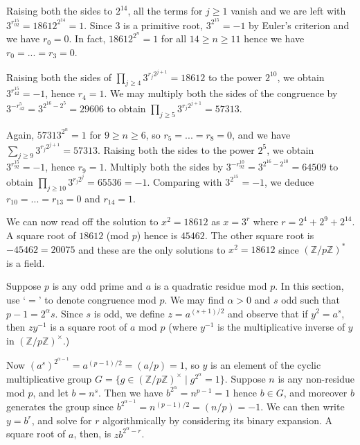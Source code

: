 \documentclass[12pt]{article}
\begin{document}
Raising both the sides to \(2^{14}\), all the terms for \(j\geq 1\) vanish and
we are left with \(3^{r_02^{15}}= 18612^{2^{14}} = 1\). Since \(3\) is a
primitive root, \(3^{2^{15}} = -1\) by Euler's criterion and we have \(r_0=0\).
In fact, \(18612^{2^n}=1\) for all \(14\geq n\geq 11\) hence we have \(r_0=...=r_3 =
0\). 

Raising both the sides of \(\prod_{j\geq 4}3^{r_j2^{j+1}}=18612\) to the power
\(2^{10}\), we obtain \(3^{r_42^{15}}=-1\), hence \(r_4 = 1\). We may multiply
both the sides of the congruence by \(3^{-r_42^5} = 3^{2^{16}-2^5} = 29606\) to
obtain \(\prod_{j\geq 5}3^{r_j2^{j+1}}=57313.\) 

Again, \(57313^{2^n}=1\) for \(9\geq n \geq 6\), so \(r_5=...=r_8=0\), and we
have \(\sum_{j\geq 9}3^{r_j2^{j+1}} = 57313\). Raising both the sides to the
power \(2^5\), we obtain \(3^{r_92^{15}}=-1\), hence \(r_9 = 1\). Multiply both
the sides by \(3^{-r_92^{10}} = 3^{2^{16}-2^{10}} = 64509\) to obtain
\(\prod_{j\geq 10}3^{r_j2^j} = 65536 = -1\). Comparing with \(3^{2^{15}} = -1\),
we deduce \(r_{10} = ... = r_{13}=0\) and \(r_{14}=1\).

We can now read off the solution to \(x^2 = 18612\) as \(x= 3^r\) where
\(r=2^4+2^9+2^{14}\). A square root of \(18612\) (mod \(p\)) hence is
\(45462\). The other square root is \(-45462= 20075\) and these are the only
solutions to \(x^2 =18612\) since \((\mathbb{Z}/p\mathbb{Z})^\ast\) is a field.

\hfill 

Suppose \(p\) is any odd prime and \(a\) is a quadratic residue mod \(p\). In
this section, use `\(=\)' to denote congruence mod \(p\). We may find \(\alpha >
0\) and \(s\) odd such that \(p-1 = 2^\alpha s\). Since \(s\) is odd, we
define \(z = a^{(s+1)/2}\) and observe that if \(y^2 = a^s\), then \(zy^{-1}\)
is a square root of \(a\) mod \(p\) (where \(y^{-1}\) is the multiplicative inverse of
\(y\) in \((\mathbb{Z}/p\mathbb{Z})^\times\).)

Now \((a^s)^{2^{\alpha - 1}} = a^{(p-1)/2} = (a/p)= 1\), so \(y\) is an  element of the
cyclic multiplicative group \(G=\{g\in
(\mathbb{Z}/p\mathbb{Z})^\times\;|\;g^{2^{\alpha}} = 1\}\). Suppose \(n\) is any
non-residue mod \(p\), and let \(b=n^s\). Then we have \(b^{2^\alpha}=n^{p-1} =
1\) hence \(b\in G\), and moreover \(b\) generates the group since
\(b^{2^{\alpha - 1}}=n^{(p-1)/2} = (n/p)=-1\). We can then write \(y = b^r\),
and solve for \(r\) algorithmically by considering its binary expansion. A
square root of \(a\), then, is \(zb^{2^{\alpha}-r}\).
\end{document}
